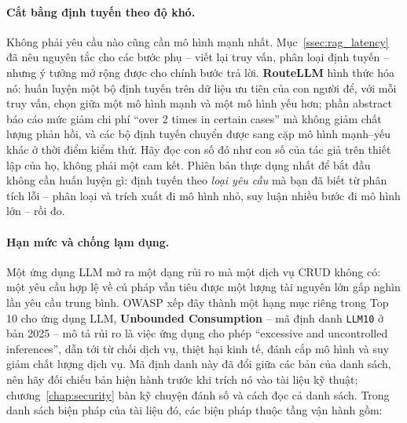 \paragraph{Cắt bằng định tuyến theo độ khó.} Không phải yêu cầu nào cũng cần mô hình mạnh nhất. Mục~\ref{ssec:rag_latency} đã nêu nguyên tắc cho các bước phụ -- viết lại truy vấn, phân loại định tuyến -- nhưng ý tưởng mở rộng được cho chính bước trả lời. \textbf{RouteLLM} \cite{ong2024routellm} hình thức hóa nó: huấn luyện một bộ định tuyến trên dữ liệu ưu tiên của con người để, với mỗi truy vấn, chọn giữa một mô hình mạnh và một mô hình yếu hơn; phần abstract báo cáo mức giảm chi phí ``over 2 times in certain cases'' mà không giảm chất lượng phản hồi, và các bộ định tuyến chuyển được sang cặp mô hình mạnh--yếu khác ở thời điểm kiểm thử. Hãy đọc con số đó như con số của tác giả trên thiết lập của họ, không phải một cam kết. Phiên bản thực dụng nhất để bắt đầu không cần huấn luyện gì: định tuyến theo \emph{loại yêu cầu} mà bạn đã biết từ phân tích lỗi -- phân loại và trích xuất đi mô hình nhỏ, suy luận nhiều bước đi mô hình lớn -- rồi đo.

\paragraph{Hạn mức và chống lạm dụng.} Một ứng dụng LLM mở ra một dạng rủi ro mà một dịch vụ CRUD không có: một yêu cầu hợp lệ về cú pháp vẫn tiêu được một lượng tài nguyên lớn gấp nghìn lần yêu cầu trung bình. OWASP xếp đây thành một hạng mục riêng trong Top 10 cho ứng dụng LLM, \textbf{Unbounded Consumption} \cite{owasp2025llmtop10} -- mã định danh \texttt{LLM10} ở bản 2025 -- mô tả rủi ro là việc ứng dụng cho phép ``excessive and uncontrolled inferences'', dẫn tới từ chối dịch vụ, thiệt hại kinh tế, đánh cắp mô hình và suy giảm chất lượng dịch vụ. Mã định danh này đã đổi giữa các bản của danh sách, nên hãy đối chiếu bản hiện hành trước khi trích nó vào tài liệu kỹ thuật; chương~\ref{chap:security} bàn kỹ chuyện đánh số và cách đọc cả danh sách. Trong danh sách biện pháp của tài liệu đó, các biện pháp thuộc tầng vận hành gồm:

